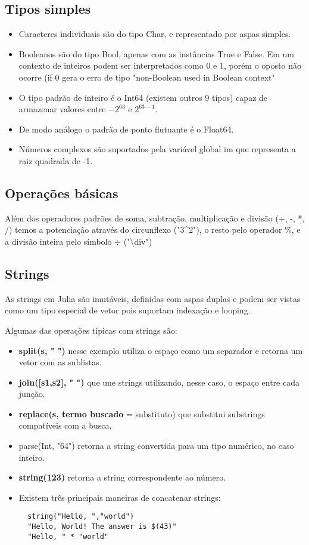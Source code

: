 \subsection{Tipos simples}
\begin{itemize}
    \item Caracteres individuais são do tipo Char, e representado por aspas simples.
    \item Booleanos são do tipo Bool, apenas com as instâncias True e False. Em um contexto de inteiros podem ser interpretados como 0 e 1, porém o oposto não ocorre (if 0 gera o erro de tipo "non-Boolean used in Boolean context"
    \item O tipo padrão de inteiro é o Int64 (existem outros 9 tipos) capaz de armazenar valores entre $-2^{63}$ e $2^{63-1}$.
    \item De modo análogo o padrão de ponto flutuante é o Float64.
    \item Números complexos são suportados pela variável global im que representa a raiz quadrada de -1.
\end{itemize}

\subsection{Operações básicas}
Além dos operadores padrões de soma, subtração, multiplicação e divisão (+, -, *, /) temos a potenciação através do circunflexo ("3\^{}2"), o resto pelo operador \%, e a divisão inteira pelo símbolo $\div$ ("\textbackslash div")

\subsection{Strings}
As strings em Julia são imutáveis, definidas com aspas duplas e podem ser vistas como um tipo especial de vetor pois suportam indexação e looping.


Algumas das operações típicas com strings são:
\begin{itemize}
    \item \textbf{split(s, " ")} nesse exemplo utiliza o espaço como um separador e retorna um vetor com as sublistas.
    \item \textbf{join([s1,s2], " ")} que une strings utilizando, nesse caso, o espaço entre cada junção.
    \item \textbf{replace(s, {termo buscado}} =  {substituto}) que substitui substrings compatíveis com a busca.
    \item parse(Int, "64") retorna a string convertida para um tipo numérico, no caso inteiro.
    \item \textbf{string(123)} retorna a string correspondente ao número.
    \item Existem três principais maneiras de concatenar strings:
        \subitem 
        \begin{lstlisting}    
  string("Hello, ","world")
  "Hello, World! The answer is $(43)"
  "Hello, " * "world"
        \end{lstlisting}
        
\end{itemize}


